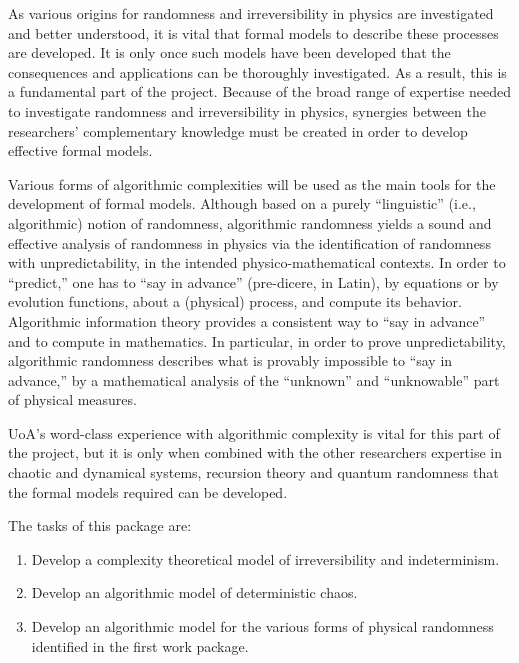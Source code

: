 \documentclass[12pt]{article}
\begin{document}
As various origins for randomness and irreversibility in physics are investigated and better understood, it is vital that formal models to describe these processes are developed. It is only once such models have been developed that the consequences and applications can be thoroughly investigated. As a result, this is a fundamental part of the project. Because of the broad range of expertise needed to investigate randomness and irreversibility in physics, synergies between the researchers' complementary knowledge must be created in order to develop effective formal models.

Various forms of algorithmic complexities will be used as the main tools for the development of formal models. Although based on a purely ``linguistic''
 (i.e., algorithmic) notion of randomness, algorithmic randomness yields a sound and effective analysis  of randomness in physics via the
identification of randomness with unpredictability, in the intended
physico-mathematical contexts.
In order to ``predict,'' one has to ``say in advance'' (pre-dicere, in Latin),
by equations or by evolution functions, about a (physical) process, and compute its behavior.
Algorithmic information theory provides a consistent way to  ``say in advance'' and to compute in mathematics.
In particular, in order to prove unpredictability, algorithmic randomness describes what is
provably impossible to ``say in advance,''  by a mathematical analysis of the
``unknown'' and ``unknowable'' part of physical measures.

UoA's word-class experience with algorithmic complexity is vital for this part of the project, but it is only when combined with the other researchers expertise in chaotic and dynamical systems, recursion theory and quantum randomness that the formal models required can be developed.

The tasks of this package are:
\begin{enumerate}[label=Task
2.\arabic{enumi}:,leftmargin=3\parindent, labelindent=0pt, labelsep=*]
	\item Develop a complexity theoretical model of irreversibility and indeterminism.
	\item Develop an algorithmic model of deterministic chaos.
	\item Develop an algorithmic model for the various forms of physical randomness identified in the first work package.
\end{enumerate}
\end{document}
